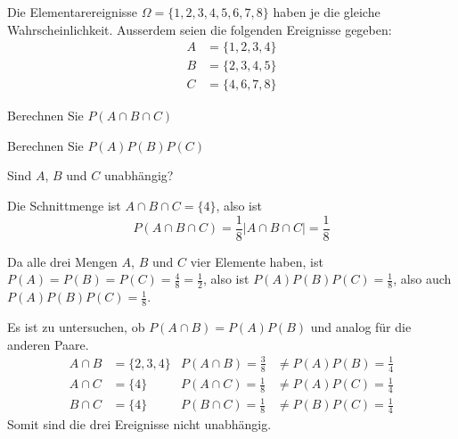 Die Elementarereignisse $\Omega=\{1,2,3,4,5,6,7,8\}$ haben je die gleiche
Wahrscheinlichkeit. Ausserdem seien die folgenden Ereignisse gegeben:
\begin{align*}
A&=\{1,2,3,4\}\\
B&=\{2,3,4,5\}\\
C&=\{4,6,7,8\}
\end{align*}
\begin{teilaufgaben}
\item Berechnen Sie $P(A\cap B\cap C)$
\item Berechnen Sie $P(A)P(B)P(C)$
\item Sind $A$, $B$ und $C$ unabhängig?
\end{teilaufgaben}


\begin{loesung}
\begin{teilaufgaben}
\item Die Schnittmenge ist $A\cap B\cap C=\{4\}$, also ist
\[
P(A\cap B\cap C)=\frac18|A\cap B\cap C|=\frac18
\]
\item Da alle drei Mengen $A$, $B$ und $C$ vier Elemente haben,
ist $P(A)=P(B)=P(C)=\frac{4}{8}=\frac12$, also ist
$P(A)P(B)P(C)=\frac18$, also auch $P(A)P(B)P(C)=\frac18$.
\item Es ist zu untersuchen, ob $P(A\cap B)=P(A)P(B)$ und analog für
die anderen Paare.
\begin{align*}
A\cap B&=\{2,3,4\}&P(A\cap B)=\frac38&\ne P(A)P(B)=\frac14\\
A\cap C&=\{4\}&P(A\cap C)=\frac18&\ne P(A)P(C)=\frac14\\
B\cap C&=\{4\}&P(B\cap C)=\frac18&\ne P(B)P(C)=\frac14
\end{align*}
Somit sind die drei Ereignisse nicht unabhängig.
\qedhere
\end{teilaufgaben}
\end{loesung}

